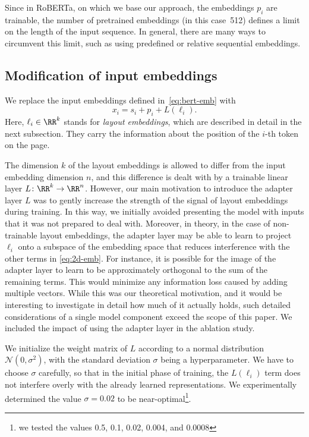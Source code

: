 Since in RoBERTa, on which we base our approach, the embeddings \(p_i\) are
trainable, the number of pretrained embeddings (in this case~512) defines a
limit on the length of the input sequence. In general, there are many ways to
circumvent this limit, such as using predefined \citep{Vaswani2017-transformer}
or relative \citep{dai2019-transformer-xl} sequential embeddings.


\subsection{Modification of input embeddings}
\label{sec:method}


We replace the input embeddings defined in~\eqref{eq:bert-emb} with
\begin{equation}
  \label{eq:2d-emb}
  x_i = s_i + p_{i} + L(\ell_{i}).
\end{equation}
Here, \(\ell_{i}\in\RR^{k}\) stands for \emph{layout embeddings}, which are
described in detail in the next subsection. They carry the information about
the position of the \(i\)-th token on the page.

The dimension \(k\) of the layout embeddings is allowed to differ from the input
embedding dimension \(n\), and this difference is dealt with by a trainable
linear layer \(L\colon \RR^{k}\to\RR^{n}\). However, our main motivation to
introduce the adapter layer \(L\) was to gently increase the strength of the
signal of layout embeddings during training. In this way, we initially avoided
presenting the model with inputs that it was not prepared to deal with. Moreover, in
theory, in the case of non-trainable layout embeddings, the adapter layer may be
able to learn to project \(\ell_{i}\) onto a subspace of the embedding space
that reduces interference with the other terms in \eqref{eq:2d-emb}. For
instance, it is possible for the image of the adapter layer to learn to be
approximately orthogonal to the sum of the remaining terms. This would minimize
any information loss caused by adding multiple vectors. While this was our
theoretical motivation, and it would be interesting to investigate in detail how
much of it actually holds, such detailed considerations of a single model
component exceed the scope of this paper. We included the impact of using the
adapter layer in the ablation study.

We initialize the weight matrix of \(L\) according to a normal distribution
\(\mathcal{N}(0,\sigma^2)\), with the standard deviation \(\sigma\) being a
hyperparameter. We have to choose \(\sigma\) carefully, so that in the initial
phase of training, the \(L(\ell_i)\) term does not interfere overly with the
already learned representations. We experimentally determined the value
\(\sigma=0.02\) to be near-optimal\footnote{we tested the values 0.5, 0.1, 0.02,
  0.004, and 0.0008}.


